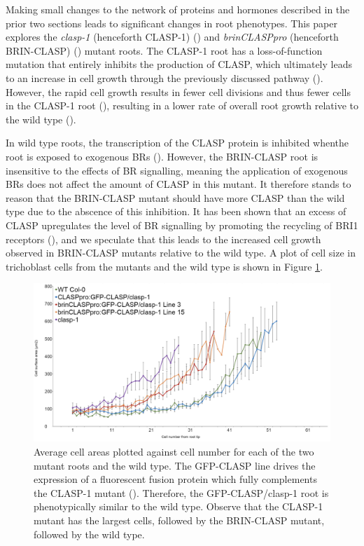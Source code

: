Making small changes to the network of proteins and hormones described in the prior two sections leads to significant changes in root phenotypes. This paper explores the \emph{clasp-1} (henceforth CLASP-1) (\cite{ambrose2007}) and \emph{brinCLASPpro} (henceforth BRIN-CLASP) (\cite{ruan2018}) mutant roots. The CLASP-1 root has a loss-of-function mutation that entirely inhibits the production of CLASP, which ultimately leads to an increase in cell growth through the previously discussed pathway (\cite{halat2022}). However, the rapid cell growth results in fewer cell divisions and thus fewer cells in the CLASP-1 root (\cite{halat2022}), resulting in a lower rate of overall root growth relative to the wild type (\cite{ambrose2007}). 


\medskip

In wild type roots, the transcription of the CLASP protein is inhibited whenthe root is exposed to exogenous BRs (\cite{ruan2018}). However, the BRIN-CLASP root is insensitive to the effects of BR signalling, meaning the application of exogenous BRs does not affect the amount of CLASP in this mutant. It therefore stands to reason that the BRIN-CLASP mutant should have more CLASP than the wild type due to the abscence of this inhibition. It has been shown that an excess of CLASP upregulates the level of BR signalling by promoting the recycling of BRI1 receptors (\cite{ruan2018}), and we speculate that this leads to the increased cell growth observed in BRIN-CLASP mutants relative to the wild type. A plot of cell size in trichoblast cells from the mutants and the wild type is shown in Figure \ref{fig:mutant-sizes}. 

\medskip

\begin{figure}
    \centering
    \includegraphics[width=13cm]{img/mutant-cell-sizes.png}
    \caption{Average cell areas plotted against cell number for each of the two mutant roots and the wild type. The GFP-CLASP line drives the expression of a fluorescent fusion protein which fully complements the CLASP-1 mutant (\cite{ambrose2011}). Therefore, the GFP-CLASP/clasp-1 root is phenotypically similar to the wild type. Observe that the CLASP-1 mutant has the largest cells, followed by the BRIN-CLASP mutant, followed by the wild type.}
    \label{fig:mutant-sizes}
\end{figure}







